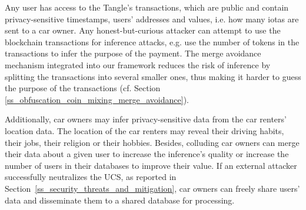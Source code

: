 Any user has access to the Tangle's transactions, which are public and contain privacy-sensitive timestamps, users' addresses and values, i.e. how many iotas are sent to a car owner. Any honest-but-curious attacker can attempt to use the blockchain transactions for inference attacks, e.g. use the number of tokens in the transactions to infer the purpose of the payment. The merge avoidance mechanism integrated into our framework reduces the risk of inference by splitting the transactions into several smaller ones, thus making it harder to guess the purpose of the transactions (cf. Section \ref{ss_obfuscation_coin_mixing_merge_avoidance}). 

Additionally, car owners may infer privacy-sensitive data from the car renters' location data. The location of the car renters may reveal their driving habits, their jobs, their religion or their hobbies.
Besides, colluding car owners can merge their data about a given user to increase the inference's quality or increase the number of users in their databases to improve their value.
If an external attacker successfully neutralizes the UCS, as reported in Section~\ref{ss_security_threats_and_mitigation}, car owners can freely share users' data and disseminate them to a shared database for processing. 

